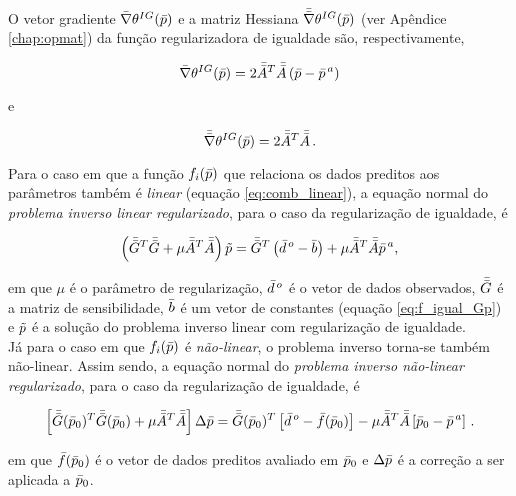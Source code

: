\indent O vetor gradiente $\bar{\nabla}\theta^{IG}(\bar{p})$ e a matriz Hessiana
$\bar{\bar{\nabla}}\theta^{IG}(\bar{p})$ (ver Apêndice \ref{chap:opmat}) da função
regularizadora de igualdade são, respectivamente,

\begin{equation}
\bar{\nabla}\theta^{IG}(\bar{p}) = 2\bar{\bar{A}}^T\bar{\bar{A}}
    \left(\bar{p} - \bar{p}^{\thinspace a} \right)
\end{equation}

\noindent e

\begin{equation}
\bar{\bar{\nabla}}\theta^{IG}(\bar{p}) = 2\bar{\bar{A}}^T\bar{\bar{A}} \thinspace .
\end{equation}

\indent Para o caso em que a função $f_i(\bar{p})$ que relaciona
os dados preditos aos parâmetros também é {\it linear} (equação \ref{eq:comb_linear}),
a equação normal do {\it problema inverso linear regularizado},
para o caso da regularização de igualdade, é

\begin{equation}
\left(\bar{\bar{G}}^T\bar{\bar{G}} + \mu\bar{\bar{A}}^T\bar{\bar{A}}\right)\tilde{p} =
    \bar{\bar{G}}^T\left(\bar{d}^{\thinspace o} - \bar{b} \right) +
    \mu\bar{\bar{A}}^T\bar{\bar{A}}\bar{p}^{\thinspace a} ,
\end{equation}

\noindent em que $\mu$ é o parâmetro de regularização, $\bar{d}^{\thinspace o}$
é o vetor de dados observados, $\bar{\bar{G}}$ é a matriz de sensibilidade, $\bar{b}$
é um vetor de constantes (equação \ref{eq:f_igual_Gp}) e $\tilde{p}$ é a solução
do problema inverso linear com regularização de igualdade.
\\
\indent Já para o caso em que $f_i(\bar{p})$ é {\it não-linear}, o problema
inverso torna-se também não-linear. Assim sendo, a equação normal do
{\it problema inverso não-linear regularizado}, para o caso da regularização de
igualdade, é

\begin{equation}
\left[\bar{\bar{G}}(\bar{p}_0)^T\bar{\bar{G}}(\bar{p}_0) +
      \mu\bar{\bar{A}}^T\bar{\bar{A}}\right]\Delta\bar{p} =
\bar{\bar{G}}(\bar{p}_0)^T \left[\bar{d}^{\thinspace o} - \bar{f}(\bar{p}_0)\right] -
\mu\bar{\bar{A}}^T\bar{\bar{A}}\left[\bar{p}_0 - \bar{p}^{\thinspace a}\right]
    \thinspace .
\end{equation}

\noindent em que $\bar{f}(\bar{p}_0)$ é o vetor de dados preditos avaliado em
$\bar{p}_0$ e $\Delta\bar{p}$ é a correção a ser aplicada a $\bar{p}_0$.

